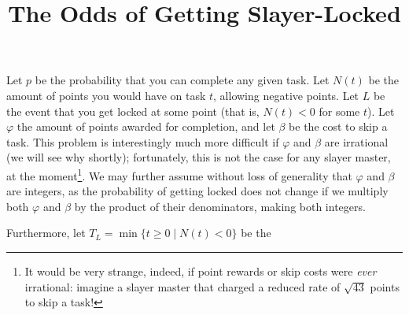 \documentclass[letterpaper]{article}
\title{The Odds of Getting Slayer-Locked}
\begin{document}
\maketitle

Let $p$ be the probability that you can complete any given task. Let $N(t)$ be the amount of points you would have on task $t$, allowing negative points. Let $L$ be the event that you get locked at some point (that is, $N(t) < 0$ for some $t$). Let $\varphi$ the amount of points awarded for completion, and let $\beta$ be the cost to skip a task. This problem is interestingly much more difficult if $\varphi$ and $\beta$ are irrational (we will see why shortly); fortunately, this is not the case for any slayer master, at the moment\footnote{It would be very strange, indeed, if point rewards or skip costs were \emph{ever} irrational: imagine a slayer master that charged a reduced rate of $\sqrt{43}$ points to skip a task!}. We may further assume without loss of generality that $\varphi$ and $\beta$ are integers, as the probability of getting locked does not change if we multiply both $\varphi$ and $\beta$ by the product of their denominators, making both integers. 

Furthermore, let $T_L = \min\{t\ge 0 \mid N(t) < 0\}$ be the 
\end{document}
